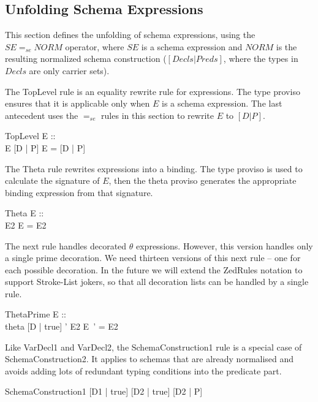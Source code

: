 \documentclass{entcs}
\newcommand{\sexprUnfoldsTo}{\mathrel{=_{se}}}
\newcommand{\declListUnfoldsTo}{\mathrel{=_d}}
\newcommand{\is}{\mathrel{is}}
\begin{document}
\subsection{Unfolding Schema Expressions}

This section defines the unfolding of schema expressions,
using the $SE \sexprUnfoldsTo NORM$ operator, where $SE$
is a schema expression and $NORM$ is the resulting normalized
schema construction ($[Decls|Preds]$, where the types in $Decls$
are only carrier sets).

The TopLevel rule is an equality rewrite rule for expressions.  The
type proviso ensures that it is applicable only when $E$ is a schema
expression.  The last antecedent uses the $\sexprUnfoldsTo$ rules in
this section to rewrite $E$ to $[D | P]$.

\begin{zedrule}{TopLevel}
  \proviso E :: \power [D2 | true] \\
  E  \sexprUnfoldsTo [D | P]
\derives
  E = [D | P]
\end{zedrule}

The Theta rule rewrites expressions into a binding.  The type
proviso is used to calculate the signature of $E$, then the theta
proviso generates the appropriate binding expression from that
signature.
\begin{zedrule}{Theta}
  \proviso E :: \power [D | true] \\
  \proviso \theta [D | true] \is E2
\derives
  \theta E = E2
\end{zedrule}


The next rule handles decorated $\theta$ expressions.  However, this
version handles only a single prime decoration.  We need thirteen
versions of this next rule -- one for 
each possible decoration.   In the future we will extend the ZedRules
notation to support Stroke-List jokers, so that all decoration lists can
be handled by a single rule.

\begin{zedrule}{ThetaPrime}
  \proviso E :: \power [D | true] \\
  \proviso theta [D | true] ' \is E2
\derives
  \theta E~' = E2
\end{zedrule}

Like VarDecl1 and VarDecl2, the SchemaConstruction1 rule is a special
case of SchemaConstruction2.  It applies to schemas that are already
normalised and avoids adding lots of redundant typing conditions into
the predicate part.
\begin{zedrule}{SchemaConstruction1}
  [D1 | true] \declListUnfoldsTo [D2 | true]
\derives
  [D1 | P] \sexprUnfoldsTo [D2 | P]
\end{zedrule}
\end{document}
